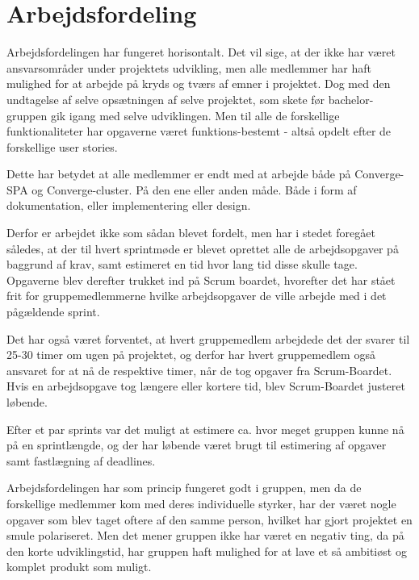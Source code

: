 
\section{Arbejdsfordeling}

Arbejdsfordelingen har fungeret horisontalt. Det vil sige, at der ikke har været ansvarsområder under projektets udvikling, men alle medlemmer har haft mulighed for at arbejde på kryds og tværs af emner i projektet. Dog med den undtagelse af selve opsætningen af selve projektet, som skete før bachelor-gruppen gik igang med selve udviklingen. Men til alle de forskellige funktionaliteter  har opgaverne været funktions-bestemt - altså opdelt efter de forskellige user stories.

Dette har betydet at alle medlemmer er endt med at arbejde både på Converge-SPA og Converge-cluster. På den ene eller anden måde. Både i form af dokumentation, eller implementering eller design.

Derfor er arbejdet ikke som sådan blevet fordelt, men har i stedet foregået således, at der til hvert sprintmøde er blevet oprettet alle de arbejdsopgaver på baggrund af krav, samt estimeret en tid hvor lang tid disse skulle tage. Opgaverne blev derefter trukket ind på Scrum boardet, hvorefter det har stået frit for gruppemedlemmerne hvilke arbejdsopgaver de ville arbejde med i det pågældende sprint.

Det har også været forventet, at hvert gruppemedlem arbejdede det der svarer til 25-30 timer om ugen på projektet, og derfor har hvert gruppemedlem også ansvaret for at nå de respektive timer, når de tog opgaver fra Scrum-Boardet. Hvis en arbejdsopgave tog længere eller kortere tid, blev Scrum-Boardet justeret løbende. 

Efter et par sprints var det muligt at estimere ca. hvor meget gruppen kunne nå på en sprintlængde, og der har løbende været brugt til estimering af opgaver samt fastlægning af deadlines.

Arbejdsfordelingen har som princip fungeret godt i gruppen, men da de forskellige medlemmer kom med deres individuelle styrker, har der været nogle opgaver som blev taget oftere af den samme person, hvilket har gjort projektet en smule polariseret. Men det mener gruppen ikke har været en negativ ting, da på den korte udviklingstid, har gruppen haft mulighed for at lave et så ambitiøst og komplet produkt som muligt.